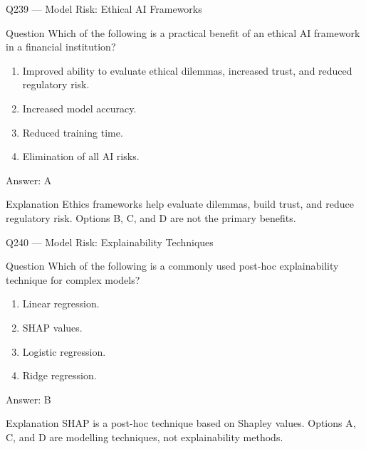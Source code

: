 \documentclass[aspectratio=169,8pt]{beamer}
\begin{document}
																																																			
																									\begin{frame}{Q239 --- Model Risk: Ethical AI Frameworks}
																										\begin{block}{Question}
																											Which of the following is a practical benefit of an ethical AI framework in a financial institution?
																											\begin{enumerate}
																												\item Improved ability to evaluate ethical dilemmas, increased trust, and reduced regulatory risk.
																												\item Increased model accuracy.
																												\item Reduced training time.
																												\item Elimination of all AI risks.
																											\end{enumerate}  \end{block}
																											\begin{exampleblock}{Answer: A}\end{exampleblock}
																											\begin{block}{Explanation}
																												Ethics frameworks help evaluate dilemmas, build trust, and reduce regulatory risk. Options B, C, and D are not the primary benefits.
																											\end{block}
																										\end{frame}
																										
																										\begin{frame}{Q240 --- Model Risk: Explainability Techniques}
																											\begin{block}{Question}
																												Which of the following is a commonly used post-hoc explainability technique for complex models?
																												\begin{enumerate}
																													\item Linear regression.
																													\item SHAP values.
																													\item Logistic regression.
																													\item Ridge regression.
																												\end{enumerate}  \end{block}
																												\begin{exampleblock}{Answer: B}\end{exampleblock}
																												\begin{block}{Explanation}
																													SHAP is a post-hoc technique based on Shapley values. Options A, C, and D are modelling techniques, not explainability methods.
																												\end{block}
																											\end{frame}
																											
\end{document}
